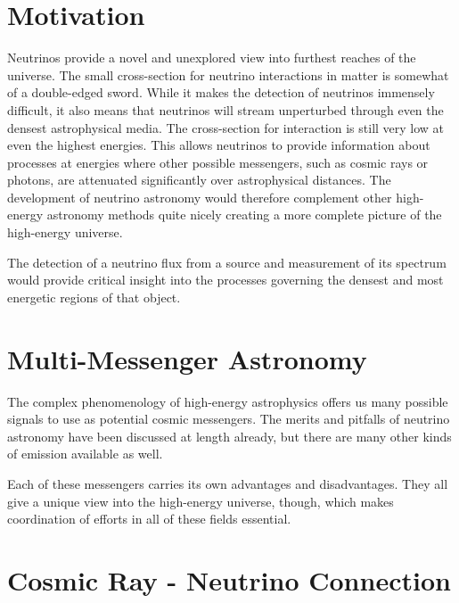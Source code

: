 \documentclass{gatech-thesis}
\begin{document}
\section{Motivation}
Neutrinos provide a novel and unexplored view into furthest reaches of the universe. The small cross-section for neutrino interactions in matter is somewhat of a double-edged sword. While it makes the detection of neutrinos immensely difficult, it also means that neutrinos will stream unperturbed through even the densest astrophysical media. The cross-section for interaction is still very low at even the highest energies. This allows neutrinos to provide information about processes at energies where other possible messengers, such as cosmic rays or photons, are attenuated significantly over astrophysical distances. The development of neutrino astronomy would therefore complement other high-energy astronomy methods quite nicely creating a more complete picture of the high-energy universe.


The detection of a neutrino flux from a source and measurement of its spectrum would provide critical insight into the processes governing the densest and most energetic regions of that object.

\section{Multi-Messenger Astronomy}
The complex phenomenology of high-energy astrophysics offers us many possible signals to use as potential cosmic messengers. The merits and pitfalls of neutrino astronomy have been discussed at length already, but there are many other kinds of emission available as well.

 Each of these messengers carries its own advantages and disadvantages. They all give a unique view into the high-energy universe, though, which makes coordination of efforts in all of these fields essential.
\section{Cosmic Ray - Neutrino Connection}
\end{document}
